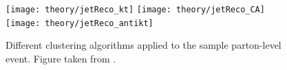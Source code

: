 \begin{figure}[htp]
\centering
\texttt{[image: theory/jetReco\_kt]}\hfill
\texttt{[image: theory/jetReco\_CA]}\hfill
\texttt{[image: theory/jetReco\_antikt]}\hfill
\caption{Different clustering algorithms applied to the sample parton-level event.
Figure taken from \cite{Cacciari:2008gp}.}
\label{fig:JetClustering}
\end{figure}



%
%
%
%
%
%
%
